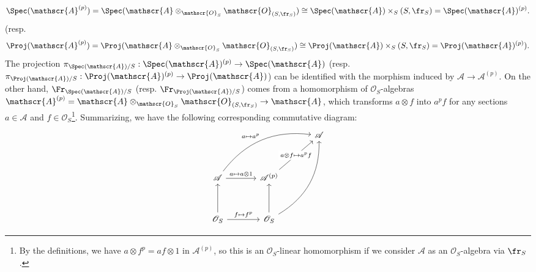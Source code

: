 \[\Spec(\mathscr{A}^{(p)})=\Spec(\mathscr{A}\otimes_{\mathscr{O}_S}\mathscr{O}_{(S,\fr_S)})\cong\Spec(\mathscr{A})\times_S(S,\fr_S)=\Spec(\mathscr{A})^{(p)}.\]
(resp.
\[\Proj(\mathscr{A}^{(p)})=\Proj(\mathscr{A}\otimes_{\mathscr{O}_S}\mathscr{O}_{(S,\fr_S)})\cong\Proj(\mathscr{A})\times_S(S,\fr_S)=\Proj(\mathscr{A})^{(p)}).\]
The projection $\pi_{\Spec(\mathscr{A})/S}:\Spec(\mathscr{A})^{(p)}\to\Spec(\mathscr{A})$ (resp. $\pi_{\Proj(\mathscr{A})/S}:\Proj(\mathscr{A})^{(p)}\to\Proj(\mathscr{A})$) can be identified with the morphism induced by $\mathscr{A}\to\mathscr{A}^{(p)}$. On the other hand, $\Fr_{\Spec(\mathscr{A})/S}$ (resp. $\Fr_{\Proj(\mathscr{A})/S}$) comes from a homomorphism of $\mathscr{O}_S$-algebras $\mathscr{A}^{(p)}=\mathscr{A}\otimes_{\mathscr{O}_S}\mathscr{O}_{(S,\fr_S)}\to\mathscr{A}$, which transforms $a\otimes f$ into $a^pf$ for any sections $a\in\mathscr{A}$ and $f\in\mathscr{O}_S$\footnote{By the definitions, we have $a\otimes f^p=af\otimes 1$ in $\mathscr{A}^{(p)}$, so this is an $\mathscr{O}_S$-linear homomorphism if we consider $\mathscr{A}$ as an $\mathscr{O}_S$-algebra via $\fr_S$.}. Summarizing, we have the following corresponding commutative diagram:
\[\begin{tikzcd}[row sep=12mm,column sep=12mm]
&&\mathscr{A}\\
\mathscr{A}\ar[rru,bend left=30pt,"a\mapsto a^p"]\ar[r,"{a\mapsto a\otimes 1}"]&\mathscr{A}^{(p)}\ar[ru,"{a\otimes f\mapsto a^pf}"description]&\\
\mathscr{O}_S\ar[u]\ar[r,"f\mapsto f^p"]&\mathscr{O}_S\ar[ruu,bend right=30pt]\ar[u]&
\end{tikzcd}\]

